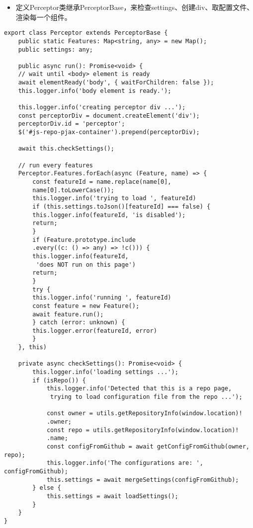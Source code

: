 \begin{itemize}
\item 定义Perceptor类继承PerceptorBase，来检查settings、创建div、取配置文件、渲染每一个组件。
\end{itemize}
\begin{lstlisting}
export class Perceptor extends PerceptorBase {
    public static Features: Map<string, any> = new Map();
    public settings: any;

    public async run(): Promise<void> {
    // wait until <body> element is ready
    await elementReady('body', { waitForChildren: false });
    this.logger.info('body element is ready.');

    this.logger.info('creating perceptor div ...');
    const perceptorDiv = document.createElement('div');
    perceptorDiv.id = 'perceptor';
    $('#js-repo-pjax-container').prepend(perceptorDiv);

    await this.checkSettings();

    // run every features
    Perceptor.Features.forEach(async (Feature, name) => {
        const featureId = name.replace(name[0],
        name[0].toLowerCase());
        this.logger.info('trying to load ', featureId)
        if (this.settings.toJson()[featureId] === false) {
        this.logger.info(featureId, 'is disabled');
        return;
        }
        if (Feature.prototype.include
        .every((c: () => any) => !c())) {
        this.logger.info(featureId,
         'does NOT run on this page')
        return;
        }
        try {
        this.logger.info('running ', featureId)
        const feature = new Feature();
        await feature.run();
        } catch (error: unknown) {
        this.logger.error(featureId, error)
        }
    }, this)

    private async checkSettings(): Promise<void> {
        this.logger.info('loading settings ...');
        if (isRepo()) {
            this.logger.info('Detected that this is a repo page,
             trying to load configuration file from the repo ...');

            const owner = utils.getRepositoryInfo(window.location)!
            .owner;
            const repo = utils.getRepositoryInfo(window.location)!
            .name;
            const configFromGithub = await getConfigFromGithub(owner, repo);
            this.logger.info('The configurations are: ', configFromGithub);
            this.settings = await mergeSettings(configFromGithub);
        } else {
            this.settings = await loadSettings();
        }
    }
}
\end{lstlisting}
